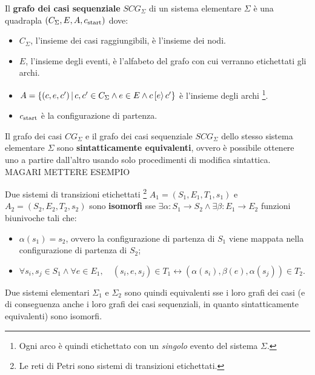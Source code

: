 \begin{defn}
    Il \textbf{grafo dei casi sequenziale} $SCG_{\Sigma}$ di un sistema elementare $\Sigma$ è una quadrapla $(C_{\Sigma}, E, A, c_{\textnormal{start}})$ dove:
    \begin{itemize}
        \item $C_{\Sigma}$, l'insieme dei casi raggiungibili, è l'insieme dei nodi.
        \item $E$, l'insieme degli eventi, è l'alfabeto del grafo con cui verranno etichettati gli archi.
        \item $A = \left\{(c, e, c') \, | \, c, c' \in C_{\Sigma} \land e \in E \land c\,[e\rangle\,c'\right\}$ è l'insieme degli archi \footnote{Ogni arco è quindi etichettato con un \textit{singolo} evento del sistema $\Sigma$.}.
        \item $c_{\textnormal{start}}$ è la configurazione di partenza.
    \end{itemize}
\end{defn}

\begin{property}
    Il grafo dei casi $CG_{\Sigma}$ e il grafo dei casi sequenziale $SCG_{\Sigma}$ dello stesso sistema elementare $\Sigma$ sono \textbf{sintatticamente equivalenti}, ovvero è possibile ottenere uno a partire dall'altro usando solo procedimenti di modifica sintattica.\\
    MAGARI METTERE ESEMPIO
\end{property}

\begin{thm}
    Due sistemi di transizioni etichettati \footnote{Le reti di Petri sono sistemi di transizioni etichettati.} $A_1 = (S_1, E_1, T_1, s_1)$ e $A_2 = (S_2, E_2, T_2, s_2)$ sono \textbf{isomorfi} sse $\exists \alpha: S_1 \rightarrow S_2 \land \exists \beta: E_1 \rightarrow E_2$ funzioni biunivoche tali che:
    \begin{itemize}
        \item $\alpha(s_1) = s_2$, ovvero la configurazione di partenza di $S_1$ viene mappata nella configurazione di partenza di $S_2$;
        \item $\forall s_i, s_j \in S_1 \land \forall e \in E_1, \quad (s_i, e, s_j) \in T_1 \leftrightarrow (\alpha(s_i), \beta(e), \alpha(s_j)) \in T_2$.
    \end{itemize}
\end{thm}

\begin{rem}
    Due sistemi elementari $\Sigma_1$ e $\Sigma_2$ sono quindi equivalenti sse i loro grafi dei casi (e di conseguenza anche i loro grafi dei casi sequenziali, in quanto sintatticamente equivalenti) sono isomorfi.
\end{rem}

